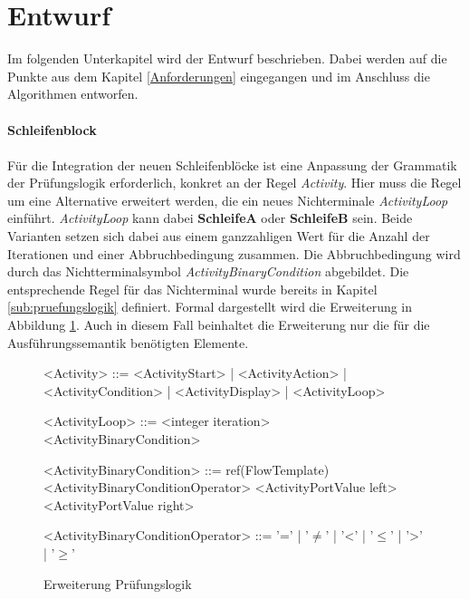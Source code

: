     \section{Entwurf}
    \label{sec:entwurf}
    Im folgenden Unterkapitel wird der Entwurf beschrieben.
    Dabei werden auf die Punkte aus dem Kapitel \ref{Anforderungen} eingegangen und im Anschluss die Algorithmen entworfen.\\
    \\
    \textbf{Schleifenblock}\\
    \\
    Für die Integration der neuen Schleifenblöcke ist eine Anpassung der Grammatik der Prüfungslogik erforderlich, konkret an der Regel \textit{Activity}.    
    Hier muss die Regel um eine Alternative erweitert werden, die ein neues Nichterminale \textit{ActivityLoop} einführt.
    \textit{ActivityLoop} kann dabei \textbf{SchleifeA} oder \textbf{SchleifeB} sein.
    Beide Varianten setzen sich dabei aus einem ganzzahligen Wert für die Anzahl der Iterationen und einer Abbruchbedingung zusammen.
    Die Abbruchbedingung wird durch das Nichtterminalsymbol \textit{ActivityBinaryCondition} abgebildet.
    Die entsprechende Regel für das Nichterminal wurde bereits in Kapitel \cref{sub:pruefungslogik} definiert.
    Formal dargestellt wird die Erweiterung in Abbildung \cref{gra:erweiterung-pruefungslogik}.
    Auch in diesem Fall beinhaltet die Erweiterung nur die für die Ausführungssemantik benötigten Elemente.
    \begin{figure}[H]
        \centering
        \begin{grammar}
            <Activity> ::= <ActivityStart>
            | <ActivityAction>
            | <ActivityCondition>
            | <ActivityDisplay>
            | <ActivityLoop>
    
            <ActivityLoop> ::= <integer iteration> <ActivityBinaryCondition>
    
            <ActivityBinaryCondition> ::= ref(FlowTemplate) <ActivityBinaryConditionOperator> <ActivityPortValue left> <ActivityPortValue right>
    
            <ActivityBinaryConditionOperator> ::= '='
            | '$\neq$' 
            | '\textless' 
            | '$\leq$' 
            | '\textgreater' 
            | '$\geq$'
        \end{grammar}        
        \caption{Erweiterung Prüfungslogik}
        \label{gra:erweiterung-pruefungslogik}
    \end{figure}
